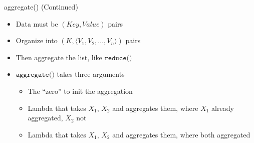 \documentclass[aspectratio=169]{beamer}
\begin{document}
\begin{frame}{aggregate() (Continued)}

\begin{itemize}
\item Data must be $(Key, Value)$ pairs
\item Organize into $(K, \langle V_1, V_2, ..., V_n \rangle )$ pairs
\item Then aggregate the list, like $\texttt{reduce()}$
\item $\texttt{aggregate()}$ takes three arguments
	\begin{itemize}
        \item The ``zero'' to init the aggregation %
	\item Lambda that takes $X_1$, $X_2$ and aggregates them, where $X_1$ already aggregated, $X_2$ not
	\item Lambda that takes $X_1$, $X_2$ and aggregates them, where both aggregated
	\end{itemize}
\end{itemize}
\end{frame}
\end{document}
